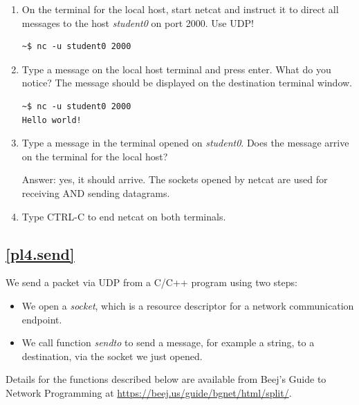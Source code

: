 \documentclass[12pt]{book}
\begin{document}
\begin{enumerate}[label=Activity \arabic*:]
\item On the terminal for the local host, start netcat and instruct it to direct all messages to the host \emph{student0} on port 2000. Use UDP!

  \begin{lstlisting}
~$ nc -u student0 2000
  \end{lstlisting}

\item Type a message on the local host terminal and press enter. What do you notice? The message should be displayed on the destination terminal window.

  \begin{lstlisting}
~$ nc -u student0 2000
Hello world!
  \end{lstlisting}

\item Type a message in the terminal opened on \emph{student0}. Does the message arrive on the terminal for the local host?

  Answer: yes, it should arrive. The sockets opened by netcat are used for receiving AND sending datagrams.
  
  \item Type CTRL-C to end netcat on both terminals.

\end{enumerate}


\subsection{\ref{pl4.send}}

We send a packet via UDP from a C/C++ program using two steps:
\begin{itemize}[label=--]
\item We open a \emph{socket}, which is a resource descriptor for a network communication endpoint.
  \item We call function \emph{sendto} to send a message, for example a string, to a destination, via the socket we just opened.
\end{itemize}
Details for the functions described below are available from Beej's Guide to Network Programming at \url{https://beej.us/guide/bgnet/html/split/}.
\end{document}
